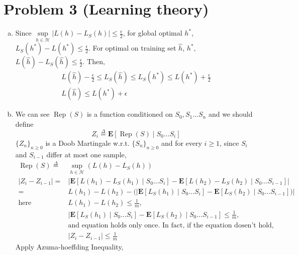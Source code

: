 \documentclass{article}
\theoremstyle{definition}
\begin{document}
	\section*{Problem 3 (Learning theory)}
	\begin{enumerate}[(a)]
		\item Since $\underset{h\in\mathcal H}{\sup} |L(h) - L_S(h)|\leq \frac{\epsilon}{2}$, for global optimal $h^*$, $L_S(h^*) - L(h^*)\leq \frac{\epsilon}{2}$. For optimal on training set $\widehat h$, $h^*$, $L(\widehat h) - L_S(\widehat h)\leq \frac{\epsilon}{2}$. Then,
		\begin{equation}
			\begin{aligned}
				L(\widehat h) - \frac{\epsilon}{2} \leq L_S(\widehat h) \leq L_S(h^*) \leq L(h^*) + \frac{\epsilon}{2} \\
				L(\widehat h)\leq L(h^*) + \epsilon
			\end{aligned}
		\end{equation}
		\item We can see $\operatorname{Rep}(S)$ is a function conditioned on $S_0, S_1\dots S_n$ and we should define
		\begin{equation}
			Z_i \overset{\Delta}{=} \mathbf E[\operatorname{Rep}(S)\mid S_0\dots S_i]
		\end{equation}
	 	$\{Z_n\}_{n\geq 0}$ is a Doob Martingale w.r.t. $\{S_n\}_{n\geq 0}$ and for every $i \geq 1$, since $S_i$ and $S_{i-1}$ differ at most one sample, 
	 	\begin{equation}
	 		\begin{aligned}
	 			\operatorname{Rep}(S)\overset{\Delta}{=} & \underset{h\in\mathcal H}{\sup} (L(h) - L_S(h)) \\
				|Z_i-Z_{i-1}| = & |\mathbf E[L(h_1)-L_S(h_1)\mid S_0\dots S_i]-\mathbf E[L(h_2)-L_S(h_2)\mid S_0\dots S_{i-1}]|\\
				= & L(h_1) - L(h_2) - (|\mathbf E[L_S(h_1)\mid S_0\dots S_i]-\mathbf E[L_S(h_2)\mid S_0\dots S_{i-1}])|\\
				\text{here  } &
				L(h_1) - L(h_2) \leq \frac{1}{m}, \\
				& |\mathbf E[L_S(h_1)\mid S_0\dots S_i]-\mathbf E[L_S(h_2)\mid S_0\dots S_{i-1}] \leq \frac{1}{m}, \\
				& \text{and equation holds only once. In fact, if the equation dosen't hold, LHS=0}\\
				& |Z_i-Z_{i-1}| \leq \frac{1}{m}
			\end{aligned}
		 \end{equation}
	 	Apply Azuma-hoeffding Inequality, 

\end{enumerate}
\end{document}

